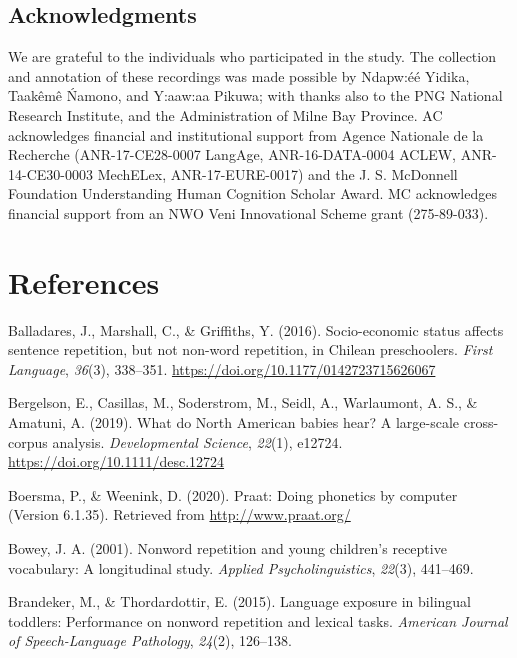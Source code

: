 \documentclass[english,,man,floatsintext]{apa6}
\begin{document}
\newpage

\hypertarget{acknowledgments}{%
\subsection{Acknowledgments}\label{acknowledgments}}

We are grateful to the individuals who participated in the study. The collection and annotation of these recordings was made possible by Ndapw:éé Yidika, Taakêmê Ńamono, and Y:aaw:aa Pikuwa; with thanks also to the PNG National Research Institute, and the Administration of Milne Bay Province. AC acknowledges financial and institutional support from Agence Nationale de la Recherche (ANR-17-CE28-0007 LangAge, ANR-16-DATA-0004 ACLEW, ANR-14-CE30-0003 MechELex, ANR-17-EURE-0017) and the J. S. McDonnell Foundation Understanding Human Cognition Scholar Award. MC acknowledges financial support from an NWO Veni Innovational Scheme grant (275-89-033).

\hypertarget{references}{%
\section{References}\label{references}}

\setlength{\parindent}{-0.5in}
\setlength{\leftskip}{0.5in}

\hypertarget{refs}{}
\leavevmode\hypertarget{ref-balladares2016socio}{}%
Balladares, J., Marshall, C., \& Griffiths, Y. (2016). Socio-economic status affects sentence repetition, but not non-word repetition, in Chilean preschoolers. \emph{First Language}, \emph{36}(3), 338--351. \url{https://doi.org/10.1177/0142723715626067}

\leavevmode\hypertarget{ref-bergelsoncasillas2019what}{}%
Bergelson, E., Casillas, M., Soderstrom, M., Seidl, A., Warlaumont, A. S., \& Amatuni, A. (2019). What do North American babies hear? A large-scale cross-corpus analysis. \emph{Developmental Science}, \emph{22}(1), e12724. \url{https://doi.org/10.1111/desc.12724}

\leavevmode\hypertarget{ref-Praat}{}%
Boersma, P., \& Weenink, D. (2020). Praat: Doing phonetics by computer (Version 6.1.35). Retrieved from \url{http://www.praat.org/}

\leavevmode\hypertarget{ref-bowey2001nonword}{}%
Bowey, J. A. (2001). Nonword repetition and young children's receptive vocabulary: A longitudinal study. \emph{Applied Psycholinguistics}, \emph{22}(3), 441--469.

\leavevmode\hypertarget{ref-brandeker2015language}{}%
Brandeker, M., \& Thordardottir, E. (2015). Language exposure in bilingual toddlers: Performance on nonword repetition and lexical tasks. \emph{American Journal of Speech-Language Pathology}, \emph{24}(2), 126--138.
\end{document}
